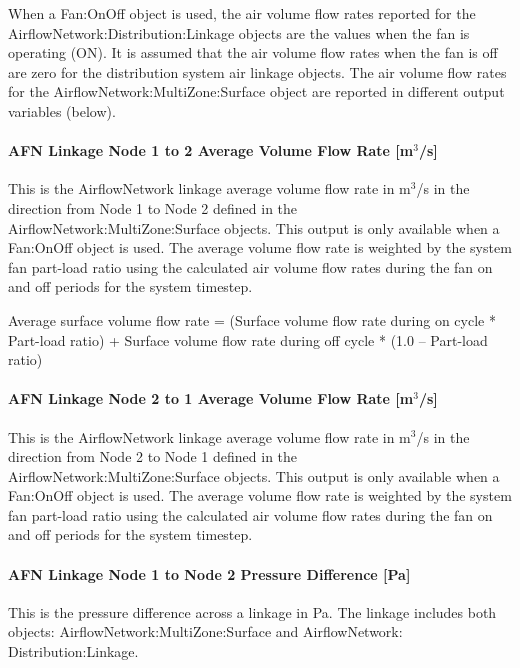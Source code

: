 When a Fan:OnOff object is used, the air volume flow rates reported for the AirflowNetwork:Distribution:Linkage objects are the values when the fan is operating (ON). It is assumed that the air volume flow rates when the fan is off are zero for the distribution system air linkage objects. The air volume flow rates for the AirflowNetwork:MultiZone:Surface object are reported in different output variables (below).

\paragraph{AFN Linkage Node 1 to 2 Average Volume Flow Rate {[}m\(^{3}\)/s{]}}\label{afn-linkage-node-1-to-2-average-volume-flow-rate-m3s}

This is the AirflowNetwork linkage average volume flow rate in m\(^{3}\)/s in the direction from Node 1 to Node 2 defined in the AirflowNetwork:MultiZone:Surface objects. This output is only available when a Fan:OnOff object is used. The average volume flow rate is weighted by the system fan part-load ratio using the calculated air volume flow rates during the fan on and off periods for the system timestep.

Average surface volume flow rate = (Surface volume flow rate during on cycle * Part-load ratio) + Surface volume flow rate during off cycle * (1.0 -- Part-load ratio)

\paragraph{AFN Linkage Node 2 to 1 Average Volume Flow Rate {[}m\(^{3}\)/s{]}}\label{afn-linkage-node-2-to-1-average-volume-flow-rate-m3s}

This is the AirflowNetwork linkage average volume flow rate in m\(^{3}\)/s in the direction from Node 2 to Node 1 defined in the AirflowNetwork:MultiZone:Surface objects. This output is only available when a Fan:OnOff object is used. The average volume flow rate is weighted by the system fan part-load ratio using the calculated air volume flow rates during the fan on and off periods for the system timestep.

\paragraph{AFN Linkage Node 1 to Node 2 Pressure Difference {[}Pa{]}}\label{afn-linkage-node-1-to-node-2-pressure-difference-pa}

This is the pressure difference across a linkage in Pa. The linkage includes both objects: AirflowNetwork:MultiZone:Surface and AirflowNetwork: Distribution:Linkage.

